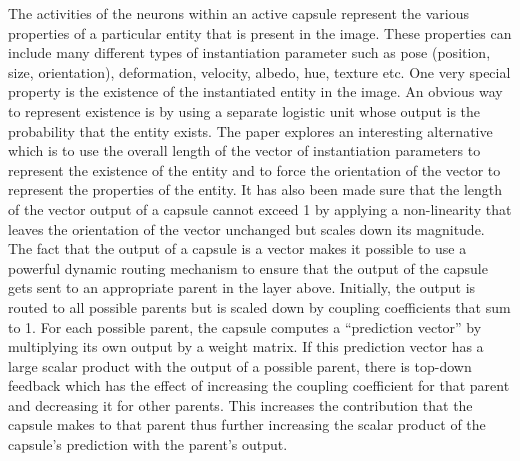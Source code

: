 \documentclass[10pt,twocolumn,letterpaper]{article}
\begin{document}
The activities of the neurons within an active capsule represent the various properties of a particular entity that is present in the image. These properties can include many different types of instantiation parameter such as pose (position, size, orientation), deformation, velocity, albedo, hue, texture etc. One very special property is the existence of the instantiated entity in the image. An obvious way to represent existence is by using a separate logistic unit whose output is the probability that the entity exists. The paper explores an interesting alternative which is to use the overall length of the vector of instantiation parameters to represent the existence of the entity and to force the orientation of the vector to represent the properties of the entity. It has also been made sure that the length of the vector output of a capsule cannot exceed 1 by applying a non-linearity that leaves the orientation of the vector unchanged but scales down its magnitude.\\

The fact that the output of a capsule is a vector makes it possible to use a powerful dynamic routing mechanism to ensure that the output of the capsule gets sent to an appropriate parent in the layer above. Initially, the output is routed to all possible parents but is scaled down by coupling coefficients that sum to 1. For each possible parent, the capsule computes a “prediction vector” by multiplying its own output by a weight matrix. If this prediction vector has a large scalar product with the output of a possible parent, there is top-down feedback which has the effect of increasing the coupling coefficient for that parent and decreasing it for other parents. This increases the contribution that the capsule makes to that parent thus further increasing the scalar product of the capsule’s prediction with the parent’s output.\\
\end{document}
